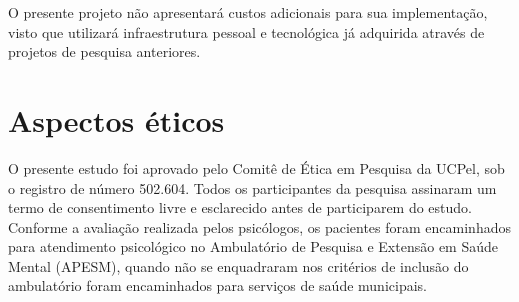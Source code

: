 \documentclass[chapter=TITLE,
               oneside,
               12pt,
               a4paper,
               english,
               brazil]{abntex2}    %
\begin{document}
    O presente projeto não apresentará custos adicionais para sua implementação,
    visto que utilizará infraestrutura pessoal e tecnológica já adquirida através
    de projetos de pesquisa anteriores.

\section{Aspectos éticos}\label{sec:aspectoseticos}

    O presente estudo foi aprovado pelo Comitê de Ética em Pesquisa da UCPel,
    sob o registro de número 502.604. Todos os participantes da pesquisa assinaram
    um termo de consentimento livre e esclarecido antes de participarem do estudo.
    Conforme a avaliação realizada pelos psicólogos, os pacientes foram encaminhados
    para atendimento psicológico no Ambulatório de Pesquisa e Extensão em Saúde Mental
    (APESM), quando não se enquadraram nos critérios de inclusão do ambulatório foram
    encaminhados para serviços de saúde municipais.

\endgroup

\postextual

\printbibliography

\apendices
\end{document}
